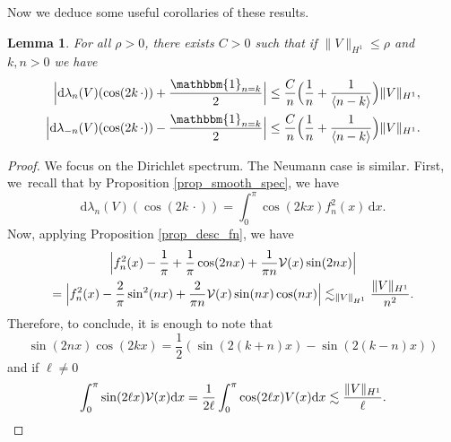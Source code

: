 \documentclass[JEP,XML,SOM,Unicode,NoEqCountersInSection,published]{cedram}
\newtheorem{lemma}[theorem]{Lemma}
\theoremstyle{definition}
\begin{document}
Now we deduce some useful corollaries of these results.

\begin{lemma} \label{lem_est_der} For all $\rho>0$, there exists $C>0$ such that if $\|V\|_{H^1}\leq \rho$ and $k,n>0$ we have
\begin{align*}
\Bigl| \mathrm{d}\lambda_n(V)(\cos(2k\,\cdot )) + \frac{\mathbbm{1}_{n=k}}2 \Bigr|&\leq \frac C{n } \Bigl(\frac{1}n + \frac1{\langle n-k \rangle} \Bigr)\|V\|_{H^1},
\\
\Bigl| \mathrm{d}\lambda_{-n}(V)(\cos(2k\,\cdot )) - \frac{\mathbbm{1}_{n=k}}2 \Bigr|&\leq \frac C{n } \Bigl(\frac{1}n + \frac1{\langle n-k \rangle} \Bigr) \|V\|_{H^1}.
\end{align*}
\end{lemma}
\begin{proof} We focus on the Dirichlet spectrum. The Neumann case is similar.
First, we~recall that by Proposition \ref{prop_smooth_spec}, we have
\[
\mathrm{d}\lambda_n(V)(\cos(2k\,\cdot )) = \int_0^\pi \cos(2kx) f_n^2(x) \, \mathrm{d}x.
\]
Now, applying Proposition \ref{prop_desc_fn}, we have
\begin{multline*}
\Bigl|f_n^2(x) - \frac1\pi + \frac1\pi \cos(2nx) + \frac1{\pi n} \mathcal{V}(x) \sin(2n x) \Bigr| \\
=\Bigl|f_n^2(x) - \frac2\pi \sin^2(nx) + \frac2{\pi n} \mathcal{V}(x) \sin(n x) \cos(n x) \Bigr|
\lesssim_{\|V\|_{H^1}} \frac{\|V\|_{H^1}}{n^2}.
\end{multline*}
Therefore, to conclude, it is enough to note that
\[
\sin(2nx) \cos(2kx) = \frac12(\sin(2(k+n)x) - \sin(2(k-n)x))
\]
and if $\ell \neq 0$
\[
\int_0^\pi \sin(2\ell x) \mathcal{V}(x) \mathrm{d}x =\frac1{2\ell} \int_0^\pi \cos(2\ell x) V(x) \mathrm{d}x \lesssim \frac{\|V\|_{H^1}}{\ell}.\qedhere
\]
\end{proof}
\end{document}
